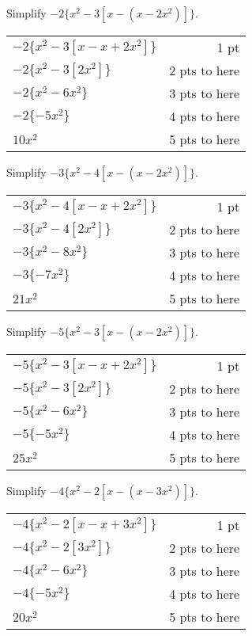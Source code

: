 {
	Simplify $-2\{x^{2}-3[x-(x-2x^{2})]\}$.
}
{
	\begin{tabular}{lr}
	$-2\{x^{2}-3[x-x+2x^{2}]\}$ & 1 pt \\
	$-2\{x^{2}-3[2x^{2}]\}$ & 2 pts to here\\
	$-2\{x^{2}-6x^{2}\}$ & 3 pts to here\\
	$-2\{-5x^{2}\}$ & 4 pts to here\\
	$10x^{2}$ & 5 pts to here
	\end{tabular}
}

{
	Simplify $-3\{x^{2}-4[x-(x-2x^{2})]\}$.
}
{
	\begin{tabular}{l r}
	$-3\{x^{2}-4[x-x+2x^{2}]\}$ & 1 pt \\
	$-3\{x^{2}-4[2x^{2}]\}$ & 2 pts to here\\
	$-3\{x^{2}-8x^{2}\}$ & 3 pts to here\\
	$-3\{-7x^{2}\}$ & 4 pts to here\\
	$21x^{2}$ & 5 pts to here
	\end{tabular}
}

{
	Simplify $-5\{x^{2}-3[x-(x-2x^{2})]\}$.
}
{
	\begin{tabular}{l r}
	$-5\{x^{2}-3[x-x+2x^{2}]\}$ & 1 pt \\
	$-5\{x^{2}-3[2x^{2}]\}$ & 2 pts to here\\
	$-5\{x^{2}-6x^{2}\}$ & 3 pts to here\\
	$-5\{-5x^{2}\}$ & 4 pts to here\\
	$25x^{2}$ & 5 pts to here
	\end{tabular}
}

{
	Simplify $-4\{x^{2}-2[x-(x-3x^{2})]\}$.
}
{
	\begin{tabular}{l r}
	$-4\{x^{2}-2[x-x+3x^{2}]\}$ & 1 pt \\
	$-4\{x^{2}-2[3x^{2}]\}$ & 2 pts to here\\
	$-4\{x^{2}-6x^{2}\}$ & 3 pts to here\\
	$-4\{-5x^{2}\}$ & 4 pts to here\\
	$20x^{2}$ & 5 pts to here
	\end{tabular}
}
